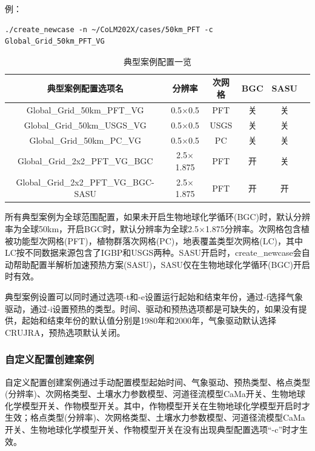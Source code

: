 例：
\begin{lstlisting}
./create_newcase -n ~/CoLM202X/cases/50km_PFT -c Global_Grid_50km_PFT_VG
\end{lstlisting}

\begin{table}[!htbp]
\renewcommand{\arraystretch}{1.5}
\centering
\caption{典型案例配置一览}\label{tab:cases_config}
\begin{tabular}{
cccccc} \toprule
\textbf{典型案例配置选项名} & \textbf{分辨率} & \textbf{次网格} & \textbf{BGC} &\textbf{SASU}\\ \midrule
Global\_Grid\_50km\_PFT\_VG & 0.5$\times$0.5 & PFT & 关 &关\\
Global\_Grid\_50km\_USGS\_VG & 0.5$\times$0.5 & USGS & 关 &关\\
Global\_Grid\_50km\_PC\_VG & 0.5$\times$0.5 & PC & 关 & 关\\
Global\_Grid\_2x2\_PFT\_VG\_BGC & 2.5$\times$1.875 & PFT& 开 &关\\
Global\_Grid\_2x2\_PFT\_VG\_BGC-SASU & 2.5$\times$1.875 & PFT& 开 & 开\\
\bottomrule
\end{tabular}
\end{table}

所有典型案例为全球范围配置，如果未开启生物地球化学循环(BGC)时，默认分辨率为全球50km，开启BGC时，默认分辨率为全球2.5$\times$1.875分辨率。次网格包含植被功能型次网格(PFT)，植物群落次网格(PC)，地表覆盖类型次网格(LC)，其中LC按不同数据来源包含了IGBP和USGS两种。SASU开启时，create\_newcase会自动帮助配置半解析加速预热方案(SASU)，SASU仅在生物地球化学循环(BGC)开启时有效。

典型案例设置可以同时通过选项-t和-e设置运行起始和结束年份，通过-f选择气象驱动，通过-i设置预热的类型。时间、驱动和预热选项都是可缺失的，如果没有提供，起始和结束年份的默认值分别是1980年和2000年，气象驱动默认选择CRUJRA，预热选项默认关闭。


\subsubsection{自定义配置创建案例}

自定义配置创建案例通过手动配置模型起始时间、气象驱动、预热类型、格点类型(分辨率)、次网格类型、土壤水力参数模型、河道径流模型CaMa开关、生物地球化学模型开关、作物模型开关。其中，作物模型开关在生物地球化学模型开启时才生效；格点类型(分辨率)、次网格类型、土壤水力参数模型、河道径流模型CaMa开关、生物地球化学模型开关、作物模型开关在没有出现典型配置选项“-c”时才生效。

